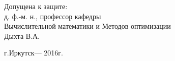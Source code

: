 \begin{titlepage}
\begin{singlespacing}
\begin{flushright}
      \vspace{1em}

      Допущена к защите:\\
      д. ф.-м. н., профессор кафедры\\ Вычислительной математики и Методов оптимизации \\ 
      \underline{\phantom{Четкая подпись}} Дыхта В.А. 


    \end{flushright}
    
    \vspace{\fill}
    
    \begin{center}
      г.Иркутск--- 2016г.
    \end{center}
    
  \end{singlespacing}
\end{titlepage}


